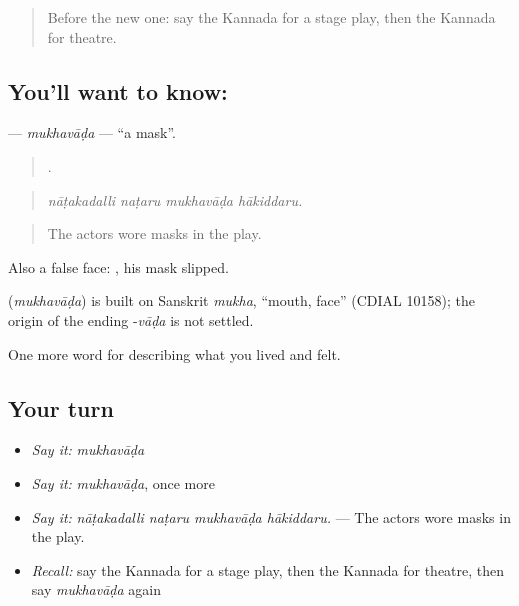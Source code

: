 \label{lesson:KA-C536-mukhavada}



\begin{quote}
Before the new one: say the Kannada for a stage play, then the Kannada for theatre.
\end{quote}

\subsection*{You'll want to know: }
\textbf{} — \emph{mukhavāḍa} — \textquotedblleft{}a mask\textquotedblright{}.

\begin{quote}
   .
\end{quote}

\begin{quote}
\emph{nāṭakadalli naṭaru mukhavāḍa hākiddaru.}
\end{quote}

\begin{quote}
The actors wore masks in the play.
\end{quote}

Also a false face:   , his mask slipped.

\begin{cousinweb}
\textbf{} (\emph{mukhavāḍa}) is built on Sanskrit \emph{mukha}, \textquotedblleft{}mouth, face\textquotedblright{} (CDIAL 10158); the origin of the ending -\emph{vāḍa} is not settled.
\end{cousinweb}

\begin{grammarlens}[title={What you've built}]
One more word for describing what you lived and felt.
\end{grammarlens}

\subsection*{Your turn}
\begin{itemize}
\raggedright
  \item \emph{Say it:} \emph{mukhavāḍa}
  \item \emph{Say it:} \emph{mukhavāḍa}, once more
  \item \emph{Say it:} \emph{nāṭakadalli naṭaru mukhavāḍa hākiddaru.} — The actors wore masks in the play.
  \item \emph{Recall:} say the Kannada for a stage play, then the Kannada for theatre, then say \emph{mukhavāḍa} again
\end{itemize}

